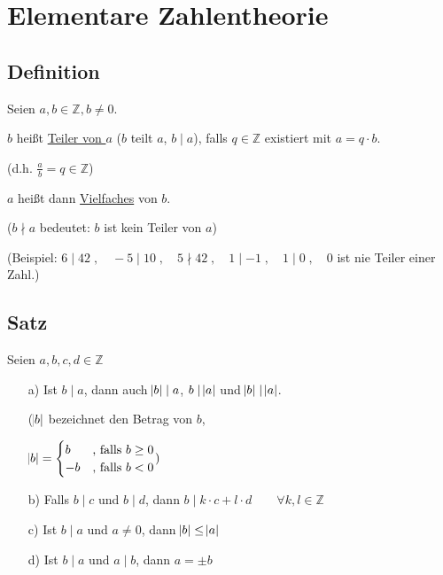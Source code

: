 \documentclass[a4paper, 12pt, twoside] {article}
\begin{document}
\section{Elementare Zahlentheorie}

\subsection{Definition}

Seien $a,b \in \mathbb{Z}, b \neq 0$.

$b$ heißt \underline{Teiler von $a$} ($b$ teilt $a$, $b \mid a$), falls $q \in \mathbb{Z}$ existiert mit $a = q \cdot b$.

(d.h. $\frac{a}{b}= q \in \mathbb{Z}$)

$a$ heißt dann \underline{Vielfaches} von $b$.

($b \nmid a$ bedeutet: $b$ ist kein Teiler von $a$)

(Beispiel: $6 \mid 42 \;, \quad -5 \mid 10 \;, \quad 5 \nmid 42 \;, \quad 1 \mid -1 \;, \quad 1 \mid 0 \;, \quad 0$ ist nie Teiler einer Zahl.)

\subsection{Satz}

Seien $a,b,c,d \in \mathbb{Z}$

\begin{itemize}

\item[a)] Ist $b \mid a$, dann auch $\abs{b} \mid a$, $b \mid \abs{a}$ und $\abs{b} \mid \abs{a}$.

($\abs{b}$ bezeichnet den Betrag von $b$,

$\abs{b} = \begin{cases}
b & \text{, falls } b \geq 0 \\
-b & \text{, falls }  b < 0
\end{cases} )$

\item[b)] Falls $b \mid c$ und $b \mid d$, dann $b \mid k \cdot c + l \cdot d \qquad \forall k,l \in \mathbb{Z}$

\item[c)] Ist $b \mid a$ und $a \neq 0$, dann $\abs{b} \leq \abs{a}$

\item[d)] Ist $b \mid a$ und $a \mid b$, dann $a = \pm b$

\end{itemize}
\end{document}
